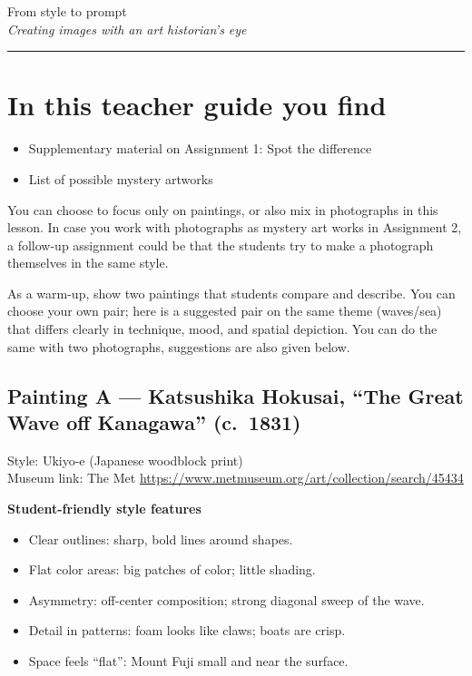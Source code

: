 \documentclass[12pt]{article}
\newcounter{exercise}
\newcommand{\exercisetitle}[2][]{%
  \refstepcounter{exercise}%
  \vspace{0.5cm}%
  \colorbox{maincolor}{%
    \makebox[\dimexpr\linewidth-2\fboxsep][l]{%
      \textcolor{white}{\faPen\ Assignment \theexercise:~ #2}%
    }%
  }%
  \if\relax\detokenize{#1}\relax\else\label{#1}\fi
  \vspace{0.3cm}%
}
\begin{document}
\newpage

\begin{center}
    {\Huge \color{maincolor} From style to prompt}\\[5pt]
    {\large \textit{Creating images with an art historian's eye}}\\
    \rule{\linewidth}{1pt}
\end{center}

\vspace{0.5cm}

\section*{In this teacher guide you find}
\begin{itemize}
  \item Supplementary material on Assignment 1: Spot the difference
  \item List of possible mystery artworks
\end{itemize}

You can choose to focus only on paintings, or also mix in photographs in this lesson. 
In case you work with photographs as mystery art works in Assignment 2, a follow-up assignment could be that the students try to make a photograph themselves in the same style. 

\exercisetitle[]{Spot the difference}

As a warm-up, show two paintings that students compare and describe. You can choose your own pair; here is a suggested pair on the same theme (waves/sea) that differs clearly in technique, mood, and spatial depiction.
You can do the same with two photographs, suggestions are also given below. 

\subsection*{Painting A — Katsushika Hokusai, ``The Great Wave off Kanagawa'' (c.\ 1831)}
Style: Ukiyo-e (Japanese woodblock print) \\
Museum link: The Met \url{https://www.metmuseum.org/art/collection/search/45434}

\textbf{Student-friendly style features}
\begin{itemize}
  \item Clear outlines: sharp, bold lines around shapes.
  \item Flat color areas: big patches of color; little shading.
  \item Asymmetry: off-center composition; strong diagonal sweep of the wave.
  \item Detail in patterns: foam looks like claws; boats are crisp.
  \item Space feels ``flat'': Mount Fuji small and near the surface.
\end{itemize}
\end{document}
